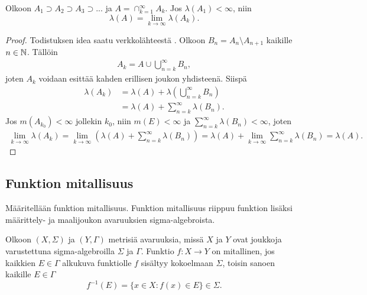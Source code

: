 \documentclass[12pt,oneside,a4paper]{amsbook} %
\begin{document}
\begin{lemma}\label{le:nestedIntersection}
    Olkoon $A_1 \supset A_2 \supset A_3 \supset ...$ ja $A = \cap_{k=1}^\infty A_k$. Jos $\lambda(A_1) < \infty$, niin 
    \begin{equation*}
        \lambda(A) = \lim_{k\to \infty}\lambda(A_k).
    \end{equation*}
\end{lemma}
\begin{proof} Todistuksen idea saatu verkkolähteestä \cite{brozius}.
    Olkoon $B_n = A_n \setminus A_{n+1}$ kaikille $n \in \mathbb{N}$. Tällöin
    \begin{align*}
        A_k = A \cup \bigcup_{n = k}^\infty B_n,
    \end{align*}
    joten $A_k$ voidaan esittää kahden erillisen joukon yhdisteenä. Siispä
    \begin{align*}
        \lambda(A_k) &= \lambda(A) + \lambda\left(\bigcup_{n = k}^\infty B_n\right) \\
        &= \lambda(A) + \sum_{n = k}^\infty\lambda(B_n).
    \end{align*}
    Jos $m(A_{k_0}) < \infty$ jollekin $k_0$, niin $m(E) < \infty$ ja $\sum_{n = k}^\infty\lambda(B_n) < \infty$, joten 
    \begin{align*}
        \lim_{k\to\infty}\lambda(A_k) = \lim_{k\to\infty}\left(\lambda(A) + \sum_{n = k}^\infty\lambda(B_n)\right) = \lambda(A) + \lim_{k\to\infty}\sum_{n=k}^\infty \lambda(B_n) = \lambda(A).
    \end{align*}
\end{proof}

\subsection{Funktion mitallisuus}
Määritellään funktion mitallisuus. Funktion mitallisuus riippuu funktion lisäksi määrittely- ja maalijoukon avaruuksien sigma-algebroista.

\begin{definition}
    Olkoon $(X, \Sigma)$ ja $(Y, \Gamma)$ metrisiä avaruuksia, missä $X$ ja $Y$ ovat joukkoja varustettuna sigma-algebroilla $\Sigma$ ja $\Gamma$. Funktio $f: X \to Y$ on mitallinen, jos kaikkien $E\in \Gamma$ alkukuva funktiolle $f$ sisältyy kokoelmaan $\Sigma$, toisin sanoen kaikille $E \in \Gamma$
    \begin{equation*}
        f^{-1}(E) = \{x \in X : f(x) \in E\} \in \Sigma.  
    \end{equation*}
\end{definition}
\end{document}
